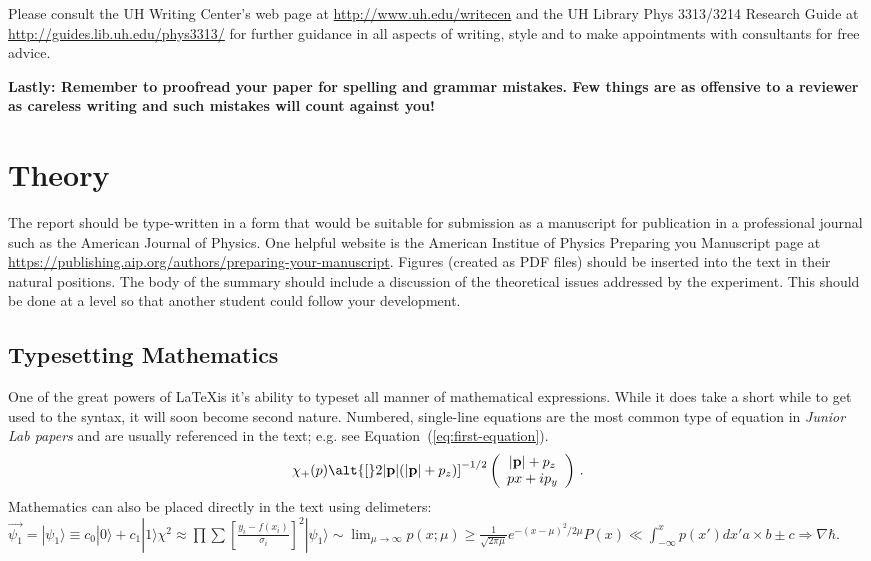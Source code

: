 \documentclass[aps,twocolumn,secnumarabic,nobalancelastpage,amsmath,amssymb,nofootinbib]{revtex4}
\begin{document}
Please consult the UH  Writing 
Center's web page at \url{http://www.uh.edu/writecen} and the UH Library Phys 3313/3214 
Research Guide at \url{http://guides.lib.uh.edu/phys3313/}  for further
guidance in all aspects of writing, style and to make appointments
with consultants for free advice.  

{\bf Lastly: Remember to proofread your paper for spelling and grammar
 mistakes.  Few things are as offensive to a reviewer as careless
 writing and such mistakes will count against you!}


\section{Theory}

The report should be type-written in a form that would be suitable
for submission as a manuscript for publication in a professional
journal such as the American Journal of Physics.  One helpful website is the American 
Institue of Physics Preparing you Manuscript page at
\url{https://publishing.aip.org/authors/preparing-your-manuscript}.  Figures (created as PDF files)
should be inserted into the text in their natural positions. The
body of the summary should include a discussion of the theoretical
issues addressed by the experiment.  This should be done at a level
so that another student could follow your development.

\subsection{Typesetting Mathematics}

One of the great powers of \LaTeX is it's ability to typeset all
manner of mathematical expressions.  While it does take a short
while to get used to the syntax, it will soon become second nature.
Numbered, single-line equations are the most common type of equation
in \textit{Junior Lab papers} and are usually referenced in the
text; e.g. see Equation~(\ref{eq:first-equation}).
%
\begin{equation}
   \chi_+(p)\alt{\bf [}2|{\bf p}|(|{\bf p}|+p_z){\bf ]}^{-1/2}
   \left(
   \begin{array}{c}
      |{\bf p}|+p_z\\
      px+ip_y
   \end{array}\right)
\,. \label{eq:first-equation}
\end{equation}
%
%
Mathematics can also be placed directly in the text using
delimeters: $\vec{\psi_1} = |\psi_1\rangle \equiv c_0|0\rangle +
c_1|1\rangle \chi^2 \approx
\prod\sum\left[\frac{y_i-f(x_i)}{\sigma_i}\right]^2 |\psi_1\rangle
\sim \lim_{\mu \rightarrow \infty}p(x;\mu) \geq \frac{1}{\sqrt{2 \pi
\mu}} e^{-(x-\mu)^2 / 2\mu}P(x) \ll \int_{-\infty}^x p(x')dx'a
\times b \pm c \Rightarrow \nabla \hbar$.
\end{document}
